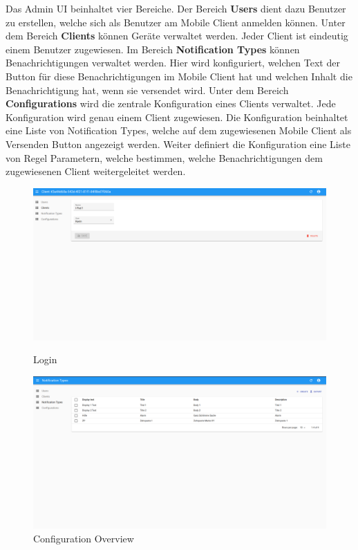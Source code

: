 Das Admin UI beinhaltet vier Bereiche.
Der Bereich \textbf{Users} dient dazu Benutzer zu erstellen, welche sich als Benutzer am Mobile Client anmelden können.
Unter dem Bereich \textbf{Clients} können Geräte verwaltet werden.
Jeder Client ist eindeutig einem Benutzer zugewiesen.
Im Bereich \textbf{Notification Types} können Benachrichtigungen verwaltet werden.
Hier wird konfiguriert, welchen Text der Button für diese Benachrichtigungen im Mobile Client hat und welchen Inhalt die Benachrichtigung hat, wenn sie versendet wird.
Unter dem Bereich \textbf{Configurations} wird die zentrale Konfiguration eines Clients verwaltet.
Jede Konfiguration wird genau einem Client zugewiesen.
Die Konfiguration beinhaltet eine Liste von Notification Types, welche auf dem zugewiesenen Mobile Client als Versenden Button angezeigt werden.
Weiter definiert die Konfiguration eine Liste von Regel Parametern, welche bestimmen, welche Benachrichtigungen dem zugewiesenen Client weitergeleitet werden.

\begin{figure}[h]
    \centering
    \begin{minipage}[b]{0.4\textwidth}
        \includegraphics[width=\textwidth]{graphics/screenshots/adminui/configuration}
        \caption{Login}
    \end{minipage}
    \hfill
    \begin{minipage}[b]{0.4\textwidth}
        \includegraphics[width=\textwidth]{graphics/screenshots/adminui/notification-type}
        \caption{Configuration Overview}
    \end{minipage}
    \label{fig:AdminUI-Screens2}
\end{figure}

